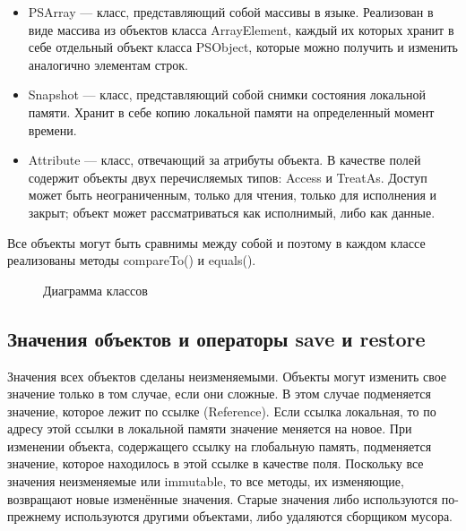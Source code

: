 \documentclass[14pt]{extarticle}
\begin{document}
\begin{itemize}
\item PSArray ---  класс, представляющий собой массивы в языке. Реализован в виде массива из объектов класса ArrayElement, каждый их которых хранит в себе отдельный объект класса PSObject, которые можно получить и изменить аналогично элементам строк.
\item Snapshot ---  класс, представляющий собой снимки состояния локальной памяти. Хранит в себе копию локальной памяти на определенный момент времени.
\item Attribute --- класс, отвечающий за атрибуты объекта. В качестве полей содержит объекты двух перечисляемых типов: Access и TreatAs. Доступ может быть неограниченным, только для чтения, только для исполнения и закрыт; объект может рассматриваться как исполнимый, либо как данные.
\end{itemize}

Все объекты могут быть сравнимы между собой и поэтому в каждом классе реализованы методы compareTo() и equals().

\begin{figure} [h]
\caption{Диаграмма классов}\label{pic_Frame}
\end{figure}

\subsection{Значения объектов и операторы save и restore}

Значения всех объектов сделаны неизменяемыми. Объекты могут изменить свое значение только в том случае, если они сложные. В этом случае  подменяется значение, которое лежит по ссылке (Reference). Если ссылка локальная, то по адресу этой ссылки в локальной памяти значение меняется на новое. При изменении объекта, содержащего ссылку на глобальную память, подменяется значение, которое находилось в этой ссылке в качестве поля. Поскольку все значения неизменяемые или immutable, то все методы, их изменяющие, возвращают новые изменённые значения. Старые значения либо используются по-прежнему используются другими объектами, либо удаляются сборщиком мусора.
\end{document}

